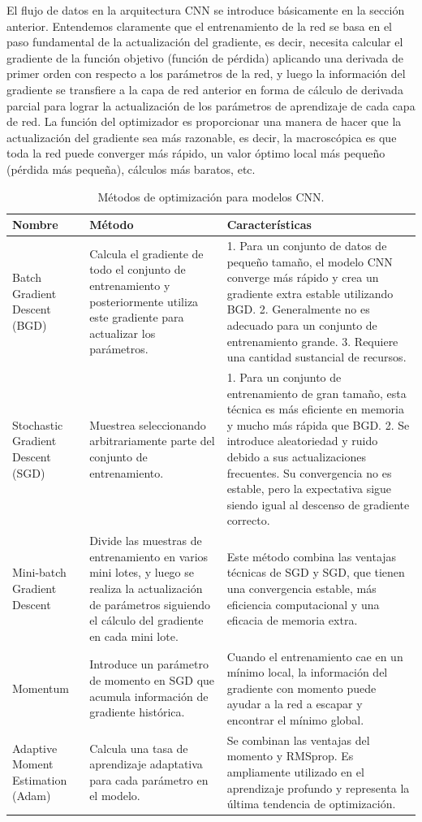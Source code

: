 El flujo de datos en la arquitectura CNN se introduce básicamente en la sección anterior. Entendemos claramente que el entrenamiento de la red se basa en el paso fundamental de la actualización del gradiente, es decir, necesita calcular el gradiente de la función objetivo (función de pérdida) aplicando una derivada de primer orden con respecto a los parámetros de la red, y luego la información del gradiente se transfiere a la capa de red anterior en forma de cálculo de derivada parcial para lograr la actualización de los parámetros de aprendizaje de cada capa de red. La función del optimizador es proporcionar una manera de hacer que la actualización del gradiente sea más razonable, es decir, la macroscópica es que toda la red puede converger más rápido, un valor óptimo local más pequeño (pérdida más pequeña), cálculos más baratos, etc.

\begin{table}[H]
	\centering
	\caption{Métodos de optimización para modelos CNN.}
	\label{tab:optimization_methods}
	\begin{tabular}{p{2.5cm}p{5cm}p{7cm}}
		\toprule
		Nombre & Método & Características \\
		\midrule
		Batch Gradient Descent (BGD) & Calcula el gradiente de todo el conjunto de entrenamiento y posteriormente utiliza este gradiente para actualizar los parámetros. & 1. Para un conjunto de datos de pequeño tamaño, el modelo CNN converge más rápido y crea un gradiente extra estable utilizando BGD. 2. Generalmente no es adecuado para un conjunto de entrenamiento grande. 3. Requiere una cantidad sustancial de recursos. \\
		\midrule
		Stochastic Gradient Descent (SGD) & Muestrea seleccionando arbitrariamente parte del conjunto de entrenamiento. & 1. Para un conjunto de entrenamiento de gran tamaño, esta técnica es más eficiente en memoria y mucho más rápida que BGD. 2. Se introduce aleatoriedad y ruido debido a sus actualizaciones frecuentes. Su convergencia no es estable, pero la expectativa sigue siendo igual al descenso de gradiente correcto. \\
		\midrule
		Mini-batch Gradient Descent & Divide las muestras de entrenamiento en varios mini lotes, y luego se realiza la actualización de parámetros siguiendo el cálculo del gradiente en cada mini lote. & Este método combina las ventajas técnicas de SGD y SGD, que tienen una convergencia estable, más eficiencia computacional y una eficacia de memoria extra. \\
		\midrule
		Momentum & Introduce un parámetro de momento en SGD que acumula información de gradiente histórica. & Cuando el entrenamiento cae en un mínimo local, la información del gradiente con momento puede ayudar a la red a escapar y encontrar el mínimo global. \\
		\midrule
		Adaptive Moment Estimation (Adam) & Calcula una tasa de aprendizaje adaptativa para cada parámetro en el modelo. & Se combinan las ventajas del momento y RMSprop. Es ampliamente utilizado en el aprendizaje profundo y representa la última tendencia de optimización. \\
		\bottomrule
	\end{tabular}
\end{table}
